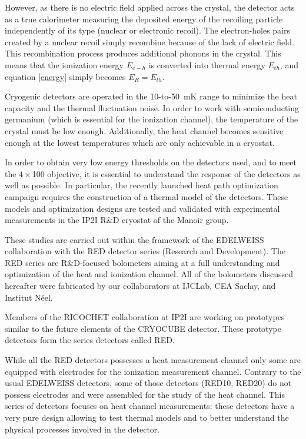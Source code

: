 However, as there is no electric field applied across the crystal, the detector acts as a true calorimeter measuring the deposited energy of the recoiling particle independently of its type (nuclear or electronic recoil).
The electron-holes pairs created by a nuclear recoil simply recombine because of the lack of electric field. This recombination process produces additional phonons in the crystal. This means that the ionization energy $E_{e-h}$ is converted into thermal energy $E_{th}$, and equation \ref{energy} simply becomes $E_R = E_{th}$.

Cryogenic detectors are operated in the 10-to-50~mK range to minimize the heat capacity and the thermal fluctuation noise. 
In order to work with semiconducting germanium (which is essential for the ionization channel), the temperature of the crystal must be low enough. Additionally, the heat channel becomes sensitive enough at the lowest temperatures which are only achievable in a cryostat.


In order to obtain very low energy thresholds on the detectors used, and to meet the $4\times $100 objective, it is essential to understand the response of the detectors as well as possible. In particular, the recently launched heat path optimization campaign requires the construction of a thermal model of the detectors. These models and optimization designs are tested and validated with experimental measurements in the IP2I R\&D cryostat of the Manoir group.

These studies are carried out within the framework of the EDELWEISS collaboration with the RED detector series (Research and Development). The RED series are R\&D-focused bolometers aiming at a full understanding and optimization of the heat and ionization channel. 
All of the bolometers discussed hereafter were fabricated by our collaborators at IJCLab, CEA Saclay, and Institut Néel.

Members of the RICOCHET collaboration at IP2I are working on prototypes similar to the future elements of the CRYOCUBE detector. These prototype detectors form the series detectors called RED.

While all the RED detectors possesses a heat measurement channel only some are equipped with electrodes for the ionization measurement channel. 
Contrary to the usual EDELWEISS detectors, some of those detectors (RED10, RED20) do not possess electrodes and were assembled for the study of the heat channel. This series of detectors focuses on heat channel measurements: these detectors have a very pure design allowing to test thermal models and to better understand the physical processes involved in the detector.


